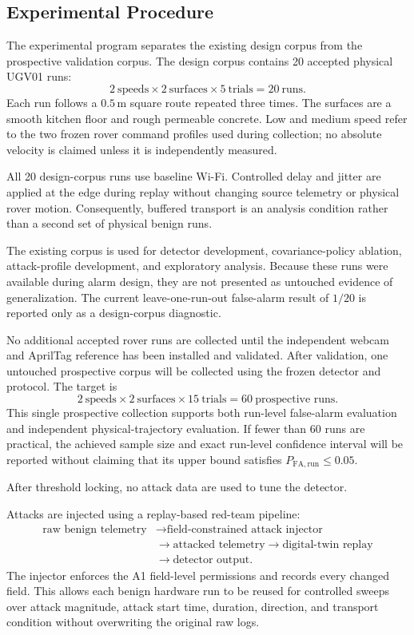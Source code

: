 \documentclass[11pt,a4paper]{article}
\begin{document}
\subsection{Experimental Procedure}

The experimental program separates the existing design corpus from the
prospective validation corpus. The design corpus contains 20 accepted physical
UGV01 runs:
\[
2\ \text{speeds} \times 2\ \text{surfaces} \times
5\ \text{trials}=20\ \text{runs}.
\]
Each run follows a $0.5\,\mathrm{m}$ square route repeated three times. The
surfaces are a smooth kitchen floor and rough permeable concrete. Low and
medium speed refer to the two frozen rover command profiles used during
collection; no absolute velocity is claimed unless it is independently
measured.

All 20 design-corpus runs use baseline Wi-Fi. Controlled delay and jitter are
applied at the edge during replay without changing source telemetry or physical
rover motion. Consequently, buffered transport is an analysis condition rather
than a second set of physical benign runs.

The existing corpus is used for detector development, covariance-policy
ablation, attack-profile development, and exploratory analysis. Because these
runs were available during alarm design, they are not presented as untouched
evidence of generalization. The current leave-one-run-out false-alarm result of
$1/20$ is reported only as a design-corpus diagnostic.

No additional accepted rover runs are collected until the independent webcam
and AprilTag reference has been installed and validated. After validation, one
untouched prospective corpus will be collected using the frozen detector and
protocol. The target is
\[
2\ \text{speeds} \times 2\ \text{surfaces} \times
15\ \text{trials}=60\ \text{prospective runs}.
\]
This single prospective collection supports both run-level false-alarm
evaluation and independent physical-trajectory evaluation. If fewer than 60
runs are practical, the achieved sample size and exact run-level confidence
interval will be reported without claiming that its upper bound satisfies
$P_{\mathrm{FA,run}}\leq0.05$.

After threshold locking, no attack data are used to tune the detector.

Attacks are injected using a replay-based red-team pipeline:
\[
\begin{aligned}
\text{raw benign telemetry}
&\rightarrow \text{field-constrained attack injector}\\
&\rightarrow \text{attacked telemetry}
\rightarrow \text{digital-twin replay}\\
&\rightarrow \text{detector output}.
\end{aligned}
\]
The injector enforces the A1 field-level permissions and records every changed
field. This allows each benign hardware run to be reused for controlled sweeps
over attack magnitude, attack start time, duration, direction, and transport
condition without overwriting the original raw logs.
\end{document}
